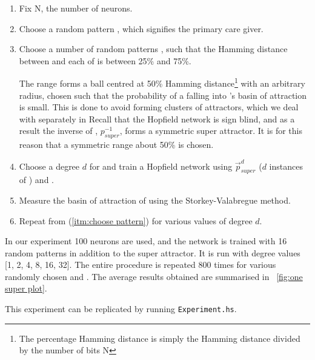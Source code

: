 \begin{enumerate}


\item Fix N, the number of neurons.

\item \label{itm:choose pattern} Choose a random pattern \psuper, which signifies the primary care giver.

\item Choose a number of random patterns \prandom, such that the Hamming distance between \psuper and each of \prandom is between 25\% and 75\%.

The range forms a ball centred at 50\% Hamming distance\footnote{The percentage Hamming distance is simply the Hamming distance divided by the number of bits N} with an arbitrary radius, chosen such that the probability of a \prandom falling into \psuper's basin of attraction is small. This is done to avoid forming clusters of attractors, which we deal with separately in  Recall that the Hopfield network is sign blind, and as a result the inverse of \psuper, $p_{super}^{-1}$, forms a symmetric super attractor. It is for this reason that a symmetric range about 50\% is chosen.

\item Choose a degree $d$ for \psuper and train a Hopfield network using $\overrightarrow{p}^d_{super}$ ($d$ instances of \psuper) and \prandom.

\item Measure the basin of attraction of \psuper using the Storkey-Valabregue method. 

\item Repeat from (\ref{itm:choose pattern}) for various values of degree $d$.

\end{enumerate}


In our experiment 100 neurons are used, and the network is trained with 16 random patterns in addition to the super attractor. It is run with degree values {[}1, 2, 4, 8, 16, 32{]}. The entire procedure is repeated 800 times for various randomly chosen \psuper and \prandom. The average results obtained are summarised in ~\ref{fig:one super plot}.

This experiment can be replicated by running \texttt{Experiment.hs}. 


